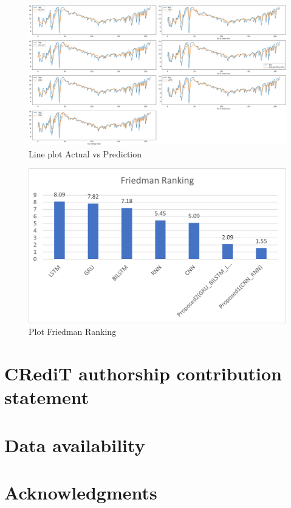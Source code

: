 \documentclass[a4paper,fleqn]{cas-sc}
\begin{document}
\begin{figure}[!ht]
\centering
\includegraphics[width=\textwidth]{udaipur_act vs pred}
\caption{Line plot Actual vs Prediction}
\label{fig:Line plot}
\end{figure}

\begin{figure}[!ht]
\centering
\includegraphics[width=\textwidth]{Friedman test}
\caption{Plot Friedman Ranking}
\label{fig:Line plot}
\end{figure}



\section*{CRediT authorship contribution statement}
\section*{Data availability}
\section*{Acknowledgments}
\label{}
\end{document}
